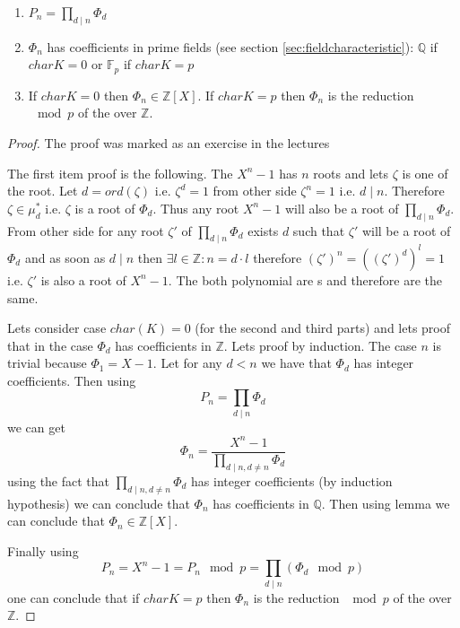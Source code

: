 \begin{proposition}
  \begin{enumerate}
    \item 
      \(
      P_n = \prod_{d \mid n} \Phi_d
      \)
    \item $\Phi_n$ has coefficients in prime fields (see section
      \ref{sec:fieldcharacteristic}): $\mathbb{Q}$ if $char K = 0$ or
      $\mathbb{F}_p$ if $char K = p$
    \item If $char K = 0$ then $\Phi_n \in
      \mathbb{Z}\left[X\right]$. If $char K = p$ then $\Phi_n$ is the
      reduction $\mod{p}$ of the 
      over $\mathbb{Z}$.
  \end{enumerate}
  \begin{proof}
    The proof was marked as an exercise in the lectures
    
    The first item proof is the following. The $X^n - 1$ has $n$ roots and
    lets $\zeta$ is one of the 
    root. Let $d=ord\left(\zeta\right)$ i.e. $\zeta^d = 1$ from other side
    $\zeta^n = 1$ i.e. $d \mid n$. Therefore $\zeta \in \mu_d^\ast$
    i.e. $\zeta$ is a root of $\Phi_d$. Thus any root $X^n - 1$ will
    also be a root of $\prod_{d \mid n} \Phi_d$.
    From other side for any root $\zeta'$ of $\prod_{d \mid n}
    \Phi_d$ exists $d$ such that $\zeta'$ will be a root of $\Phi_d$
    and as soon as $d \mid n$ then $\exists l \in \mathbb{Z}: n = d
    \cdot l$ therefore $\left(\zeta'\right)^n =
    \left(\left(\zeta'\right)^d\right)^l = 1$ i.e. $\zeta'$ is also
    a root of $X^n - 1$. The both polynomial
    are s and therefore are the same.
    
    Lets consider case
    $char(K) = 0$ (for the second and third parts) and lets proof that
    in the case $\Phi_d$ has coefficients in 
    $\mathbb{Z}$. Lets proof by induction. The case $n$ is trivial
    because 
    $\Phi_1 = X - 1$. Let for any $d < n$ we have that $\Phi_d$ has
    integer coefficients. Then using
    \[
    P_n = \prod_{d \mid n} \Phi_d
    \]
    we can get
    \[
    \Phi_n = \frac{X^n-1}{\prod_{d \mid n, d \ne n} \Phi_d}
    \]
    using the fact that $\prod_{d \mid n, d \ne n} \Phi_d$ has integer
    coefficients (by induction hypothesis) we can conclude that
    $\Phi_n$ has coefficients in $\mathbb{Q}$. Then using
     lemma we can conclude that $\Phi_n \in
    \mathbb{Z}\left[X\right]$.

    Finally using
    \[
    P_n = X^n - 1 = P_n \mod p = \prod_{d \mid n} \left(\Phi_d \mod p\right)
    \]
    one can conclude that if $char K = p$ then $\Phi_n$ is the
    reduction $\mod{p}$ of the 
    over $\mathbb{Z}$.
    
  \end{proof}
  \label{prop:lec6_cyclotomic}
\end{proposition}

